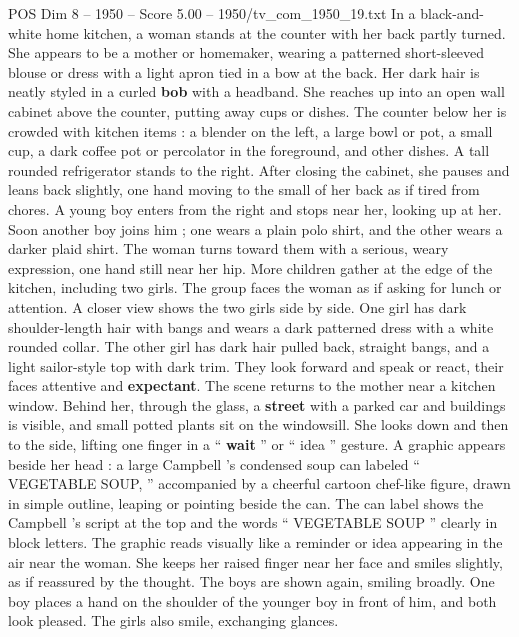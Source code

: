 \begin{textsample}{POS Dim 8 – 1950 – Score 5.00 – 1950/tv\_com\_1950\_19.txt}  \label{ex:f8_pos_074}
In a black-and-white home kitchen, a woman stands at the counter with her back partly turned.
She appears to be a mother or homemaker, wearing a patterned short-sleeved blouse or dress with a light apron tied in a bow at the back.
Her dark hair is neatly styled in a curled \textbf{bob} with a headband.
She reaches up into an open wall cabinet above the counter, putting away cups or dishes.
The counter below her is crowded with kitchen items : a blender on the left, a large bowl or pot, a small cup, a dark coffee pot or percolator in the foreground, and other dishes.
A tall rounded refrigerator stands to the right.
After closing the cabinet, she pauses and leans back slightly, one hand moving to the small of her back as if tired from chores.
A young boy enters from the right and stops near her, looking up at her.
Soon another boy joins him ; one wears a plain polo shirt, and the other wears a darker plaid shirt.
The woman turns toward them with a serious, weary expression, one hand still near her hip.
More children gather at the edge of the kitchen, including two girls.
The group faces the woman as if asking for lunch or attention.
A closer view shows the two girls side by side.
One girl has dark shoulder-length hair with bangs and wears a dark patterned dress with a white rounded collar.
The other girl has dark hair pulled back, straight bangs, and a light sailor-style top with dark trim.
They look forward and speak or react, their faces attentive and \textbf{expectant}.
The scene returns to the mother near a kitchen window.
Behind her, through the glass, a \textbf{street} with a parked car and buildings is visible, and small potted plants sit on the windowsill.
She looks down and then to the side, lifting one finger in a “ \textbf{wait} ” or “ idea ” gesture.
A graphic appears beside her head : a large Campbell ’s condensed soup can labeled “ VEGETABLE SOUP, ” accompanied by a cheerful cartoon chef-like figure, drawn in simple outline, leaping or pointing beside the can.
The can label shows the Campbell ’s script at the top and the words “ VEGETABLE SOUP ” clearly in block letters.
The graphic reads visually like a reminder or idea appearing in the air near the woman.
She keeps her raised finger near her face and smiles slightly, as if reassured by the thought.
The boys are shown again, smiling broadly.
One boy places a hand on the shoulder of the younger boy in front of him, and both look pleased.
The girls also smile, exchanging glances.

\end{textsample}
